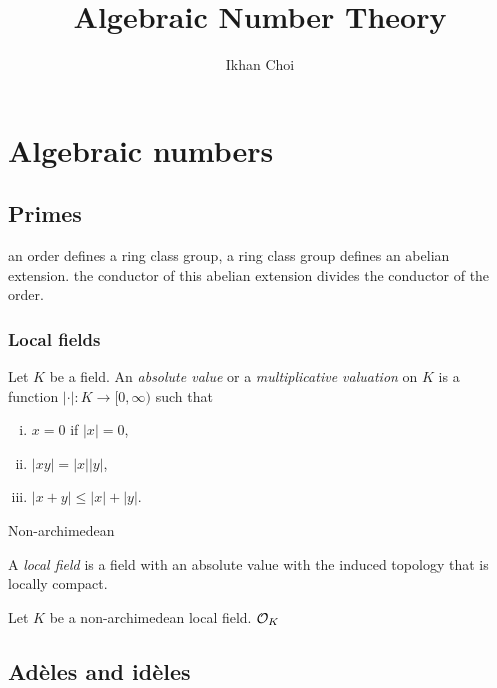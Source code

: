 \documentclass{../../large}
\begin{document}
\title{Algebraic Number Theory}
\author{Ikhan Choi}
\maketitle
\tableofcontents

\part{Algebraic numbers}
\chapter{Primes}
an order defines a ring class group, a ring class group defines an abelian extension.
the conductor of this abelian extension divides the conductor of the order.

\section{Local fields}
\begin{prb}
Let $K$ be a field.
An \emph{absolute value} or a \emph{multiplicative valuation} on $K$ is a function $|\cdot|:K\to[0,\infty)$ such that
\begin{enumerate}[(i)]
\item $x=0$ if $|x|=0$,
\item $|xy|=|x||y|$,
\item $|x+y|\le|x|+|y|$.
\end{enumerate}
Non-archimedean
\end{prb}

\begin{prb}
A \emph{local field} is a field with an absolute value with the induced topology that is locally compact.
\end{prb}

\begin{prb}
\end{prb}

\begin{prb}[Places]
\end{prb}

\begin{prb}
Let $K$ be a non-archimedean local field.
$\mathcal{O}_K$

\end{prb}


\chapter{Ad\`eles and id\`eles}
\end{document}
